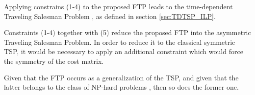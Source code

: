 Applying constrains (1-4) to the proposed FTP leads to the time-dependent Traveling Salesman Problem \cite{tdtsp_picard}, as defined in section \ref{sec:TDTSP_ILP}.

Constraints (1-4) together with (5) reduce the proposed FTP into the asymmetric Traveling Salesman Problem. In order to reduce it to the classical symmetric TSP, it would be necessary to apply an additional constraint which would force the symmetry of the cost matrix.

Given that the FTP occurs as a generalization of the TSP, and given that the latter belongs to the class of NP-hard problems \cite{np_completeness}, then so does the former one.



